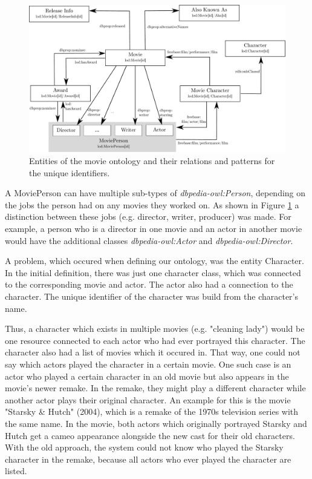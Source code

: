 \begin{figure}[h!]
\includegraphics[width=\textwidth]{images/ontology.pdf}
\caption{Entities of the movie ontology and their relations and patterns for the unique identifiers.}
\label{fig_ontology}
\end{figure}

A MoviePerson can have multiple sub-types of \textit{dbpedia-owl:Person}, depending on the jobs the person had on any movies they worked on.
As shown in Figure \ref{fig_ontology} a distinction between these jobs (e.g. director, writer, producer) was made.
For example, a person who is a director in one movie and an actor in another movie would have the additional classes \textit{dbpedia-owl:Actor} and \textit{dbpedia-owl:Director}.

A problem, which occured when defining our ontology, was the entity Character.
In the initial definition, there was just one character class, which was connected to the corresponding movie and actor.
The actor also had a connection to the character.
The unique identifier of the character was build from the character's name.

Thus, a character which exists in multiple movies (e.g. "cleaning lady") would be one resource connected to each actor who had ever portrayed this character.
The character also had a list of movies which it occured in.
That way, one could not say which actors played the character in a certain movie.
One such case is an actor who played a certain character in an old movie but also appears in the movie's newer remake.
In the remake, they might play a different character while another actor plays their original character.
An example for this is the movie "Starsky \& Hutch" (2004), which is a remake of the 1970s television series with the same name.
In the movie, both actors which originally portrayed Starsky and Hutch get a cameo appearance alongside the new cast for their old characters.
With the old approach, the system could not know who played the Starsky character in the remake, because all actors who ever played the character are listed.

